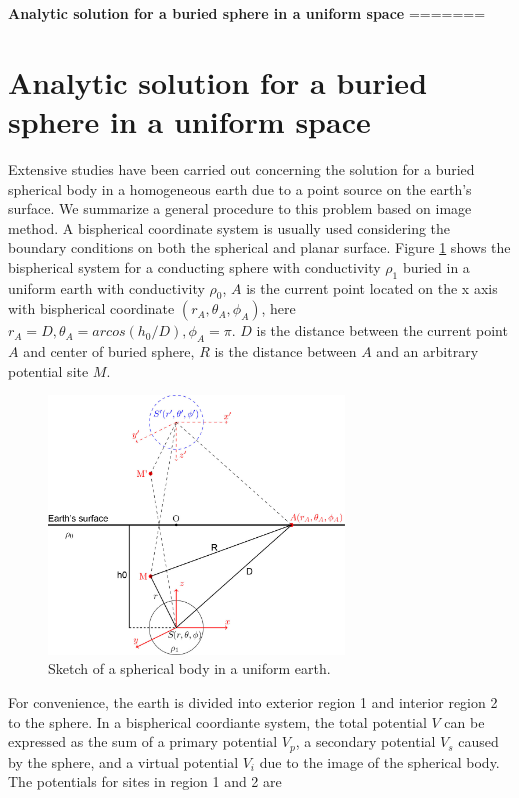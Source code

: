 \documentclass[11pt,letterpaper,leqno]{amsart}
\numberwithin{equation}{section}
\begin{document}
 \vspace{0.4cm}



\Large
\textbf{Analytic solution for a buried sphere in a uniform space}
=======

\section{Analytic solution for a buried sphere in a uniform space} 
Extensive studies have been carried out concerning the solution for a buried spherical body in a homogeneous earth due to a point source on the earth's surface. We summarize a general procedure to this problem based on image method. A bispherical coordinate system  is usually used considering the boundary conditions on both the spherical and planar surface. 
Figure \ref{fig:sketch} shows the bispherical system for a conducting sphere with conductivity $\rho_1$ buried in a uniform earth with conductivity $\rho_0$, $A$ is the current point located on the x axis with bispherical coordinate $(r_A,\theta_A,\phi_A)$, here $r_A=D, \theta_A=arcos(h_0/D), \phi_A=\pi$. $D$ is the distance between the current point $A$ and center of buried sphere, $R$ is the distance between $A$ and an arbitrary potential site $M$. 
\begin{figure}[h!]
\centering
\includegraphics[width=0.7\textwidth]{sketch.jpg}
\caption{Sketch of a spherical body in a uniform earth.}
\label{fig:sketch}
\end{figure}
For convenience, the earth is divided into exterior region 1 and interior region 2 to the sphere.  In a bispherical coordiante system, the total potential $V$ can be expressed as the sum of a primary potential $V_p$, a secondary potential $V_s$ caused by the sphere, and a virtual potential $V_i$ due to the image of the spherical body. The potentials for sites in region 1 and 2 are
\end{document}
